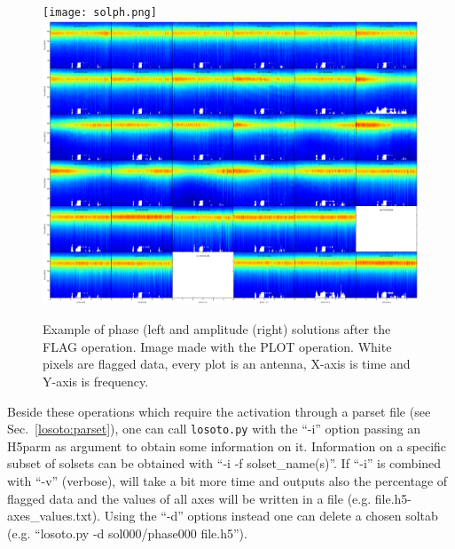 \documentclass[]{article}
\begin{document}
\begin{figure}
\centering
\texttt{[image: solph.png]}
\includegraphics[width=.48\columnwidth]{solamp.png}
\caption{Example of phase (left and amplitude (right) solutions after the FLAG operation. Image made with the PLOT operation. White pixels are flagged data, every plot is an antenna, X-axis is time and Y-axis is frequency.}\label{fig:flag}
\end{figure}

Beside these operations which require the activation through a \losoto{} parset file (see Sec.~\ref{losoto:parset}), one can call \texttt{losoto.py} with the ``-i'' option passing an H5parm as argument to obtain some information on it. Information on a specific subset of solsets can be obtained with ``-i -f solset\_name(s)''. If ``-i'' is combined with ``-v'' (verbose), \losoto{} will take a bit more time and outputs also the percentage of flagged data and the values of all axes will be written in a file (e.g. file.h5-axes\_values.txt). Using the ``-d'' options instead one can delete a chosen soltab (e.g. ``losoto.py -d sol000/phase000 file.h5'').
\end{document}
